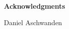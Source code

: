 

\clearpage 
\begin{center}
	\textbf{Acknowledgments} 
\end{center}

\vspace{2cm} Daniel Aschwanden 
\vfil

